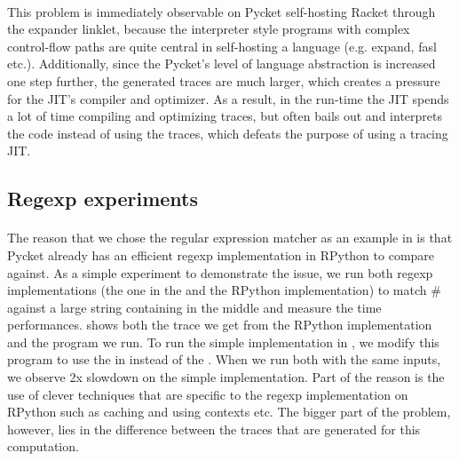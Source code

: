 		\paragraph{}%
			This problem is immediately observable on Pycket self-hosting Racket
		through the expander linklet, because the interpreter style programs
		with complex control-flow paths are quite central in self-hosting a
		language (e.g. expand, fasl etc.). Additionally, since the Pycket's
		level of language abstraction is increased one step further, the
		generated traces are much larger, which creates a pressure for the
		JIT's compiler and optimizer. As a result, in the run-time the JIT
		spends a lot of time compiling and optimizing traces, but often bails
		out and interprets the code instead of using the traces, which defeats
		the purpose of using a tracing JIT.



		\subsection{Regexp experiments}

			\paragraph{}%
			The reason that we chose the regular expression matcher as an example
			in  is that Pycket already has an efficient regexp
			implementation in RPython to compare against. As a simple experiment
			to demonstrate the issue, we run both regexp implementations (the one
			in the  and the RPython implementation) to match
			$\mathtt{\#}$ against a large string containing
			 in the middle and measure the time
			performances.  shows both the trace we get
			from the RPython implementation and the program we run. To run the
			simple implementation in , we modify this program
			to use the  in instead of the
			. When we run both with the same inputs, we
			observe 2x slowdown on the simple implementation. Part of the reason
			is the use of clever techniques that are specific to the regexp
			implementation on RPython such as caching and using contexts etc. The
			bigger part of the problem, however, lies in the difference between
			the traces that are generated for this computation.

